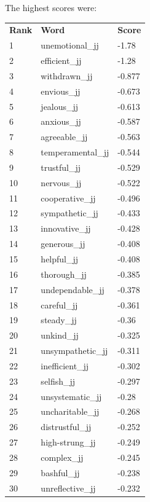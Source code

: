 \documentclass[10pt,letterpaper]{book}
\begin{document}
The highest scores were:
\begin{tabular}{ l l l }
        \textbf{Rank} & \textbf{Word} & \textbf{Score} \\
        1 & unemotional\_jj & -1.78 \\
        2 & efficient\_jj & -1.28 \\
        3 & withdrawn\_jj & -0.877 \\
        4 & envious\_jj & -0.673 \\
        5 & jealous\_jj & -0.613 \\
        6 & anxious\_jj & -0.587 \\
        7 & agreeable\_jj & -0.563 \\
        8 & temperamental\_jj & -0.544 \\
        9 & trustful\_jj & -0.529 \\
        10 & nervous\_jj & -0.522 \\
        11 & cooperative\_jj & -0.496 \\
        12 & sympathetic\_jj & -0.433 \\
        13 & innovative\_jj & -0.428 \\
        14 & generous\_jj & -0.408 \\
        15 & helpful\_jj & -0.408 \\
        16 & thorough\_jj & -0.385 \\
        17 & undependable\_jj & -0.378 \\
        18 & careful\_jj & -0.361 \\
        19 & steady\_jj & -0.36 \\
        20 & unkind\_jj & -0.325 \\
        21 & unsympathetic\_jj & -0.311 \\
        22 & inefficient\_jj & -0.302 \\
        23 & selfish\_jj & -0.297 \\
        24 & unsystematic\_jj & -0.28 \\
        25 & uncharitable\_jj & -0.268 \\
        26 & distrustful\_jj & -0.252 \\
        27 & high-strung\_jj & -0.249 \\
        28 & complex\_jj & -0.245 \\
        29 & bashful\_jj & -0.238 \\
        30 & unreflective\_jj & -0.232 \\
\end{tabular}
\end{document}
